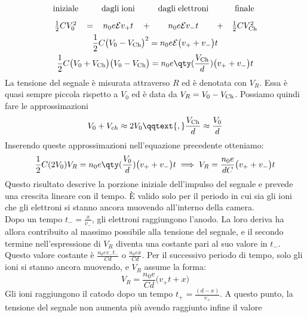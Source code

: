 \begin{approfondimento}
\begin{gather*}
\begin{array}{ccccccc}
         \rm iniziale &  & \rm dagli \; ioni &  & \rm dagli \; elettroni &  & \rm finale\\[0.3cm]
         \frac{1}{2}CV_0^2 & = & n_0 e \mathcal{E} v_{+} t & + & n_0 e \mathcal{E} v_{-} t & + & \frac{1}{2}CV_{\rm Ch}^2
      \end{array}
      \\
      \frac{1}{2}C \bigl( V_0 - V_{\rm Ch} \bigr)^2
      =n_0 e \mathcal{E} \bigl( v_{+} + v_{-} \bigr) t
      \\
      \frac{1}{2}C \bigl( V_0 + V_{\rm Ch} \bigr)\bigl( V_0 - V_{\rm Ch} \bigr)
      =n_0 e \qty( \frac{V_{\rm Ch}}{d} ) \bigl( v_{+} + v_{-} \bigr) t
   \end{gather*}
   La tensione del segnale è misurata attraverso $R$ ed è denotata con $V_R$. Essa è quasi sempre piccola rispetto a $V_0$ ed è data da $V_R=V_0-V_{\rm Ch}$. Possiamo quindi fare le approssimazioni
   \begin{equation*}
      V_0 + V_{ch} \approx 2 V_0
      \qqtext{,}
      \frac{V_{\rm Ch}}{d} \approx \frac{V_0}{d}
   \end{equation*}
   Inserendo queste approssimazioni nell'equazione precedente otteniamo:
   \begin{gather*}
      \frac{1}{2}C(2V_0)V_R=n_0 e \qty( \frac{V_0}{d} ) \bigl( v_{+} + v_{-} \bigr) t
      \implies
      V_R=\frac{n_0 e}{d C} \bigl( v_{+} + v_{-} \bigr) t
   \end{gather*}
   Questo risultato descrive la porzione iniziale dell'impulso del segnale e prevede una crescita lineare con il tempo. È valido solo per il periodo in cui sia gli ioni che gli elettroni si stanno ancora muovendo all'interno della camera.\\
   Dopo un tempo $t_{-}=\frac{x}{v_{-}}$, gli elettroni raggiungono l'anodo. La loro deriva ha allora contribuito al massimo possibile alla tensione del segnale, e il secondo termine nell'espressione di $V_R$ diventa una costante pari al suo valore in $t_{-}$. Questo valore costante è $\frac{n_0 e v_{-} t_{-}}{Cd}$ o $\frac{n_0 e x}{Cd}$. Per il successivo periodo di tempo, solo gli ioni si stanno ancora muovendo, e $V_R$ assume la forma:
   \begin{equation*}
      V_R=\frac{n_0 e}{Cd} \bigl( v_{+} t + x\bigr)
   \end{equation*}
   Gli ioni raggiungono il catodo dopo un tempo $ t_+ = \frac{(d - x)}{v_{+}} $. A questo punto, la tensione del segnale non aumenta più avendo raggiunto infine il valore
   \begin{equation*}

\end{equation*}
\end{approfondimento}
